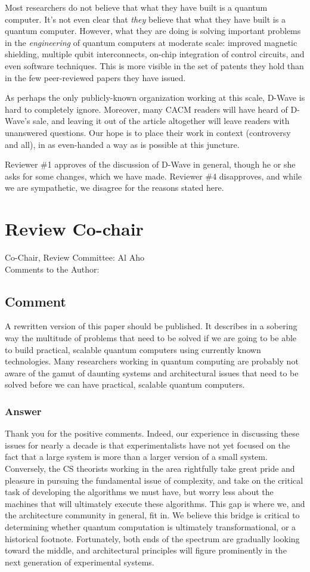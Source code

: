 \documentclass{article}
\newcommand{\comment}{\subsection{Comment}\em}
\newcommand{\answer}{\rm \subsubsection*{Answer}}
\begin{document}
Most researchers do not believe that what they have built is a quantum
computer.  It's not even clear that {\em they} believe that what they
have built is a quantum computer.  However, what they are doing is
solving important problems in the {\em engineering} of quantum
computers at moderate scale: improved magnetic shielding, multiple
qubit interconnects, on-chip integration of control circuits, and even
software techniques.  This is more visible in the set of patents they
hold than in the few peer-reviewed papers they have issued.

As perhaps the only publicly-known organization working at this scale,
D-Wave is hard to completely ignore.  Moreover, many CACM readers will
have heard of D-Wave's sale, and leaving it out of the article
altogether will leave readers with unanswered questions.  Our hope is
to place their work in context (controversy and all), in as
even-handed a way as is possible at this juncture.

Reviewer \#1 approves of the discussion of D-Wave in general, though
he or she asks for some changes, which we have made.  Reviewer \#4
disapproves, and while we are sympathetic, we disagree for the reasons
stated here.

\section{Review Co-chair}

Co-Chair, Review Committee: Al Aho\\
Comments to the Author:\\

\comment

A rewritten version of this paper should be published.  It describes
in a sobering way the multitude of problems that need to be solved if
we are going to be able to build practical, scalable quantum computers
using currently known technologies.  Many researchers working in
quantum computing are probably not aware of the gamut of daunting
systems and architectural issues that need to be solved before we can
have practical, scalable quantum computers.

\answer

Thank you for the positive comments.  Indeed, our experience in
discussing these issues for nearly a decade is that experimentalists
have not yet focused on the fact that a large system is more than a
larger version of a small system.  Conversely, the CS theorists
working in the area rightfully take great pride and pleasure in
pursuing the fundamental issue of complexity, and take on the critical
task of developing the algorithms we must have, but worry less about
the machines that will ultimately execute these algorithms.  This gap
is where we, and the architecture community in general, fit in.  We
believe this bridge is critical to determining whether quantum
computation is ultimately transformational, or a historical footnote.
Fortunately, both ends of the spectrum are gradually looking toward
the middle, and architectural principles will figure prominently in
the next generation of experimental systems.
\end{document}
